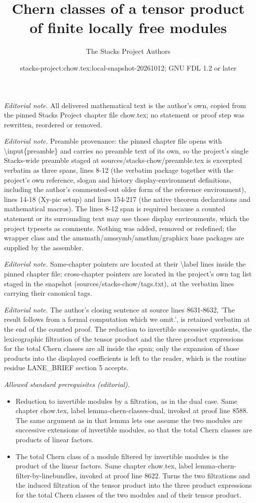 \documentclass[10pt,a4paper]{amsart}
\title{Chern classes of a tensor product of finite locally free modules}
\author{The Stacks Project Authors}
\date{stacks-project:chow.tex:local-snapshot-20261012; GNU FDL 1.2 or later}
\theoremstyle{plain}
\theoremstyle{definition}
\theoremstyle{remark}
\numberwithin{equation}{subsection}
\begin{document}
\maketitle
\noindent\textit{Editorial note.} All delivered mathematical text is the author's own, copied from the pinned Stacks Project chapter file chow.tex; no statement or proof step was rewritten, reordered or removed.\par\medskip
\noindent\textit{Editorial note.} Preamble provenance: the pinned chapter file opens with \textbackslash{}input\{preamble\} and carries no preamble text of its own, so the project's single Stacks-wide preamble staged at sources/stacks-chow/preamble.tex is excerpted verbatim as three spans, lines 8-12 (the verbatim package together with the project's own reference, slogan and history display-environment definitions, including the author's commented-out older form of the reference environment), lines 14-18 (Xy-pic setup) and lines 154-217 (the native theorem declarations and mathematical macros). The lines 8-12 span is required because a counted statement or its surrounding text may use those display environments, which the project typesets as comments. Nothing was added, removed or redefined; the wrapper class and the amsmath/amssymb/amsthm/graphicx base packages are supplied by the assembler.\par\medskip
\noindent\textit{Editorial note.} Same-chapter pointers are located at their \textbackslash{}label lines inside the pinned chapter file; cross-chapter pointers are located in the project's own tag list staged in the snapshot (sources/stacks-chow/tags.txt), at the verbatim lines carrying their canonical tags.\par\medskip
\noindent\textit{Editorial note.} The author's closing sentence at source lines 8631-8632, 'The result follows from a formal computation which we omit.', is retained verbatim at the end of the counted proof. The reduction to invertible successive quotients, the lexicographic filtration of the tensor product and the three product expressions for the total Chern classes are all inside the span; only the expansion of those products into the displayed coefficients is left to the reader, which is the routine residue LANE\_BRIEF section 5 accepts.\par\medskip
\noindent\textit{Allowed standard prerequisites (editorial).}\begin{itemize}
\item Reduction to invertible modules by a filtration, as in the dual case. Same chapter chow.tex, label lemma-chern-classes-dual, invoked at proof line 8588. The same argument as in that lemma lets one assume the two modules are successive extensions of invertible modules, so that the total Chern classes are products of linear factors.
\item The total Chern class of a module filtered by invertible modules is the product of the linear factors. Same chapter chow.tex, label lemma-chern-filter-by-linebundles, invoked at proof line 8622. Turns the two filtrations and the induced filtration of the tensor product into the three product expressions for the total Chern classes of the two modules and of their tensor product.
\end{itemize}\medskip
\end{document}
